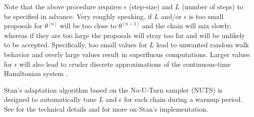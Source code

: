Note that the above procedure requires $\epsilon$ (step-size) and $L$ (number of steps) to be specified in 
advance. Very roughly speaking, if $L$ and/or $\epsilon$ is too small proposals for $\theta^{[n]}$ will be too 
close to $\theta^{[n-1]}$ and the chain will mix slowly, whereas if they are too large the proposals will stray 
too far and will be unlikely to be accepted. Specifically, too small values for $L$ lead to unwanted random 
walk behavior and overly large values result in superfluous computations. Larger values for $\epsilon$ will 
also lead to cruder discrete approximations of the continuous-time Hamiltonian system .

Stan's adaptation algorithm based on the No-U-Turn sampler (NUTS)  
is designed to automatically tune $L$ and $\epsilon$ for each chain during a warmup period. 
See  for the technical details and  
for more on Stan's implementation. 
